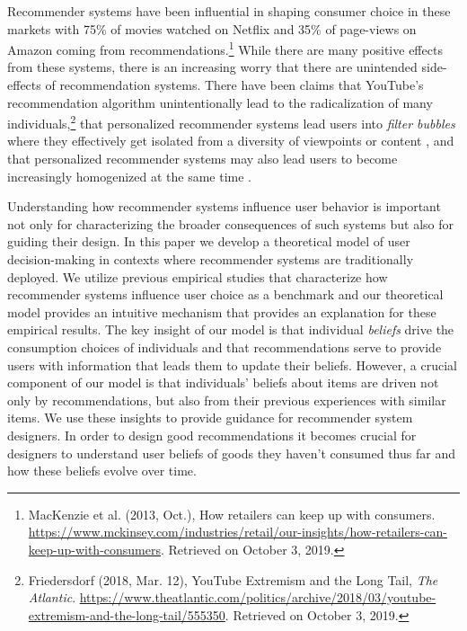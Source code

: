 \documentclass[format=acmsmall, review=false]{acmart}
\begin{document}
Recommender systems have been influential in shaping consumer choice in these markets with 75\% of movies watched on Netflix and 35\% of page-views on Amazon coming from recommendations.\footnote{MacKenzie et al. (2013, Oct.),  How retailers can keep up with consumers. \url{https://www.mckinsey.com/industries/retail/our-insights/how-retailers-can-keep-up-with-consumers}. Retrieved on October 3, 2019.} While there are many positive effects from these systems, there is an increasing worry that there are unintended side-effects of recommendation systems. There have been claims that YouTube's recommendation algorithm unintentionally lead to the radicalization of many individuals,\footnote{Friedersdorf (2018, Mar. 12), YouTube Extremism and the Long Tail, \textit{The Atlantic}. \url{https://www.theatlantic.com/politics/archive/2018/03/youtube-extremism-and-the-long-tail/555350}. Retrieved on October 3, 2019.} that personalized recommender systems lead users into \textit{filter bubbles} where they effectively get isolated from a diversity of viewpoints or content \cite{pariser2011filter}, and that personalized recommender systems may also lead users to become increasingly homogenized at the same time \cite{chaney2018algorithmic, hosanagar2013will}.
\par
Understanding how recommender systems influence user behavior is important not only for characterizing the broader consequences of such systems but also for guiding their design. In this paper we develop a theoretical model of user decision-making in contexts where recommender systems are traditionally deployed. We utilize previous empirical studies that characterize how recommender systems influence user choice as a benchmark and our theoretical model provides an intuitive mechanism that provides an explanation for these empirical results. The key insight of our model is that individual \textit{beliefs} drive the consumption choices of individuals and that recommendations serve to provide users with information that leads them to update their beliefs. However, a crucial component of our model is that individuals' beliefs about items are driven not only by recommendations, but also from their previous experiences with similar items. We use these insights to provide guidance for recommender system designers. In order to design good recommendations it becomes crucial for designers to understand user beliefs of goods they haven't consumed thus far and how these beliefs evolve over time.
\end{document}
